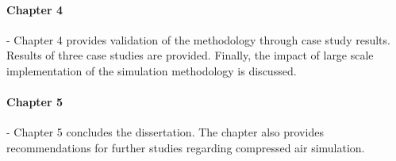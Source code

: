 	\paragraph{Chapter 4} \hspace{0.4cm} - \hspace{0.05cm} Chapter 4 provides validation of the methodology through case study results. Results of three case studies are provided. Finally, the impact of large scale implementation of the simulation methodology is discussed.
	\paragraph{Chapter 5} \hspace{0.4cm} - \hspace{0.05cm} Chapter 5 concludes the dissertation. The chapter also provides recommendations for further studies regarding compressed air simulation.

